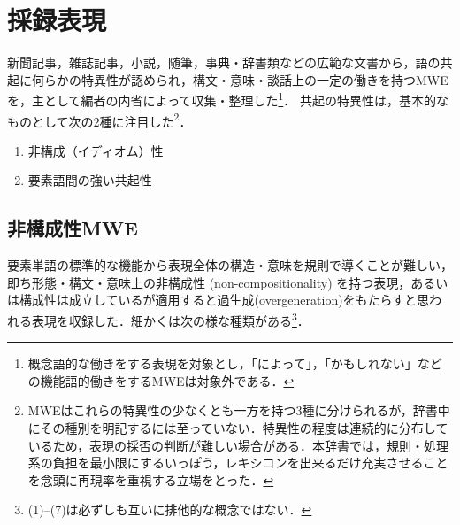 \documentclass[japanese]{jnlp_1.4}
\begin{document}
\section{採録表現}

新聞記事，雑誌記事，小説，随筆，事典・辞書類などの広範な文書から，語の共起に何らかの特異性が認められ，構文・意味・談話上の一定の働きを持つMWEを，主として編者の内省によって収集・整理した\footnote{概念語的な働きをする表現を対象とし，「によって」，「かもしれない」などの機能語的働きをするMWEは対象外である．}． 共起の特異性は，基本的なものとして次の2種に注目した\footnote{MWEはこれらの特異性の少なくとも一方を持つ3種に分けられるが，辞書中にその種別を明記するには至っていない．特異性の程度は連続的に分布しているため，表現の採否の判断が難しい場合がある．本辞書では，規則・処理系の負担を最小限にするいっぽう，レキシコンを出来るだけ充実させることを念頭に再現率を重視する立場をとった．}． 
\begin{enumerate}[　1.]
\item 非構成（イディオム）性
\item 要素語間の強い共起性
\end{enumerate}


\subsection{非構成性MWE}

要素単語の標準的な機能から表現全体の構造・意味を規則で導くことが難しい，即ち形態・構文・意味上の非構成性 (non-compositionality) を持つ表現，あるいは構成性は成立しているが適用すると過生成(overgeneration)をもたらすと思われる表現を収録した．細かくは次の様な種類がある\footnote{(1)--(7)は必ずしも互いに排他的な概念ではない．}．
\end{document}
